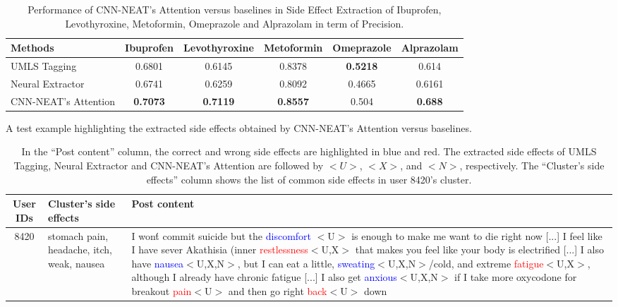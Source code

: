 \documentclass{bmcart}
\begin{document}
\begin{backmatter}
\begin{table}[h!]
  \label{table:se_discovery2}
\end{table}
\begin{table}[h!]
  \caption{Performance of CNN-NEAT's Attention versus baselines in Side Effect Extraction of Ibuprofen, Levothyroxine, Metoformin, Omeprazole and Alprazolam in term of Precision.}
  \scalebox{1.2}
  \footnotesize
  \begin{tabular}{l|c c c c c}
    \hline
    \textbf{Methods} & Ibuprofen & Levothyroxine & Metoformin & Omeprazole & Alprazolam \\ \hline
    UMLS Tagging & 0.6801 & 0.6145 & 0.8378 & \textbf{0.5218} & 0.614 \\
    Neural Extractor~\cite{ding2018attentive} & 0.6741 & 0.6259 & 0.8092 & 0.4665 & 0.6161 \\
    CNN-NEAT's Attention & \textbf{0.7073} & \textbf{0.7119} & \textbf{0.8557} & 0.504 & \textbf{0.688} \\ \hline
  \end{tabular}
  \label{table:se_extraction}
\end{table}
\begin{table}[h!]
  \caption{A test example highlighting the extracted side effects obtained by CNN-NEAT's Attention versus baselines.}
  \scalebox{1.2}
  \footnotesize
  \begin{tabular}{c p{3cm} p{7cm}}
    \hline
    User IDs & Cluster's side effects & Post content \\ \hline
    8420 & stomach pain, headache, itch, weak, nausea & I won\'t commit suicide but the \textcolor{blue}{discomfort} $<$U$>$ is enough to make me want to die right now [...] I feel like I have sever Akathisia (inner \textcolor{red}{restlessness}$<$U,X$>$ that makes you feel like your body is electrified [...] I also have \textcolor{blue}{nausea}$<$U,X,N$>$, but I can eat a little, \textcolor{blue}{sweating}$<$U,X,N$>$/cold, and extreme \textcolor{red}{fatigue}$<$U,X$>$, although I already have chronic fatigue [...] I also get \textcolor{blue}{anxious}$<$U,X,N$>$ if I take more oxycodone for breakout \textcolor{red}{pain}$<$U$>$ and then go right \textcolor{red}{back}$<$U$>$ down \\ \hline
  \end{tabular}
  \caption*{In the ``Post content'' column, the correct and wrong side effects are highlighted in blue and red. The extracted side effects of UMLS Tagging, Neural Extractor and CNN-NEAT's Attention are followed by $<U>$, $<X>$, and $<N>$, respectively. The ``Cluster's side effects'' column shows the list of common side effects in user 8420's cluster.}

\end{table}
\end{backmatter}
\end{document}
